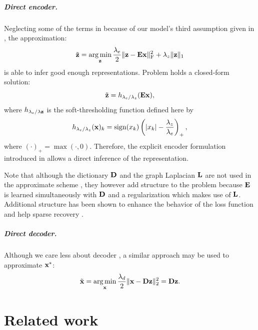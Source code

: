\paragraph{Direct encoder.}
Neglecting some of the terms in  because of our model's third assumption given in , the approximation:
\begin{equation} \label{eqn:z_approximate}
	\tilde{\mathbf{z}} = \operatorname*{arg\,min}\limits_{\mathbf{z}} \frac{\lambda_e}{2} \| \mathbf{z} - \mathbf{E} \mathbf{x} \|_\text{F}^2 + \lambda_z \| \mathbf{z} \|_1
\end{equation}
is able to infer good enough representations. Problem  holds a closed-form solution:
\begin{equation} \label{eqn:z_direct}
	\tilde{\mathbf{z}} = h_{\lambda_e / \lambda_z} (\mathbf{E} \mathbf{x}),
\end{equation}
where $h_{\lambda_e / \lambda\mathbf{z}}$ is the soft-thresholding function defined here by
\begin{equation}
	h_{\lambda_e / \lambda_z}(\mathbf{x})_k = \operatorname*{sign}(x_k) \left( |x_k| - \frac{\lambda_z}{\lambda_e} \right)_+ ,
\end{equation}
where $(\cdot)_+ = \max(\cdot, 0)$. Therefore, the explicit encoder formulation introduced in  allows a direct inference of the representation.

Note that although the dictionary $\mathbf{D}$ and the graph Laplacian $\mathbf{L}$ are not used in the approximate scheme , they however add structure to the problem because $\mathbf{E}$ is learned simultaneously with $\mathbf{D}$ and a regularization which makes use of $\mathbf{L}$. Additional structure has been shown to enhance the behavior of the loss function and help sparse recovery \cite{kowalski2009sparse, baraniuk2010modelCS, huang2011LearningStructuredSparsity, jenatton2011structured}.

\paragraph{Direct decoder.}
Although we care less about decoder , a similar approach may be used to approximate $\mathbf{x}^*$:
\begin{equation} \label{eqn:x_direct}
	\tilde{\mathbf{x}} = \operatorname*{arg\,min}\limits_{\mathbf{x}} \frac{\lambda_d}{2} \| \mathbf{x} - \mathbf{D} \mathbf{z} \|_2^2 = \mathbf{D} \mathbf{z}.
\end{equation}

\chapter{Related work}

